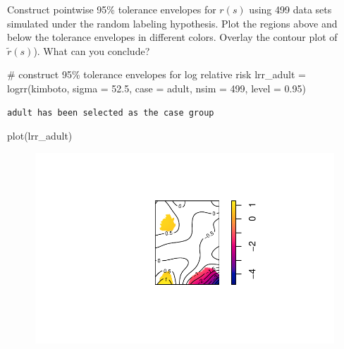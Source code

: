 \documentclass[
  letterpaper,
  DIV=11,
  numbers=noendperiod]{scrartcl}
\newenvironment{Shaded}{\begin{snugshade}}{\end{snugshade}}
\newcommand{\AttributeTok}[1]{\textcolor[rgb]{0.40,0.45,0.13}{#1}}
\newcommand{\CommentTok}[1]{\textcolor[rgb]{0.37,0.37,0.37}{#1}}
\newcommand{\DecValTok}[1]{\textcolor[rgb]{0.68,0.00,0.00}{#1}}
\newcommand{\FloatTok}[1]{\textcolor[rgb]{0.68,0.00,0.00}{#1}}
\newcommand{\FunctionTok}[1]{\textcolor[rgb]{0.28,0.35,0.67}{#1}}
\newcommand{\NormalTok}[1]{\textcolor[rgb]{0.00,0.23,0.31}{#1}}
\newcommand{\OtherTok}[1]{\textcolor[rgb]{0.00,0.23,0.31}{#1}}
\newcommand{\StringTok}[1]{\textcolor[rgb]{0.13,0.47,0.30}{#1}}
\begin{document}
Construct pointwise 95\% tolerance envelopes for \(r(s)\) using 499 data
sets simulated under the random labeling hypothesis. Plot the regions
above and below the tolerance envelopes in different colors. Overlay the
contour plot of \(\tilde{r}(s)\)). What can you conclude?

\begin{Shaded}
\begin{Highlighting}[]
\CommentTok{\# construct 95\% tolerance envelopes for log relative risk}
\NormalTok{lrr\_adult }\OtherTok{=} \FunctionTok{logrr}\NormalTok{(kimboto, }\AttributeTok{sigma =} \FloatTok{52.5}\NormalTok{, }\AttributeTok{case =} \StringTok{\textquotesingle{}adult\textquotesingle{}}\NormalTok{, }\AttributeTok{nsim =} \DecValTok{499}\NormalTok{,}
                \AttributeTok{level =} \FloatTok{0.95}\NormalTok{)}
\end{Highlighting}
\end{Shaded}

\begin{verbatim}
adult has been selected as the case group
\end{verbatim}

\begin{Shaded}
\begin{Highlighting}[]
\FunctionTok{plot}\NormalTok{(lrr\_adult)}
\end{Highlighting}
\end{Shaded}

\begin{figure}[H]

{\centering \includegraphics{cc-r-kd-hw_files/figure-pdf/unnamed-chunk-12-1.pdf}

}

\end{figure}
\end{document}
